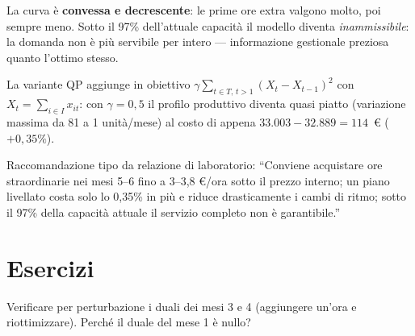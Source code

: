 \begin{center}
%
\hfill
\begin{minipage}[b]{0.46\textwidth}\small
La curva è \textbf{convessa e decrescente}: le prime ore extra valgono molto, poi
sempre meno. Sotto il 97\% dell'attuale capacità il modello diventa
\emph{inammissibile}: la domanda non è più servibile per intero --- informazione
gestionale preziosa quanto l'ottimo stesso.

\vspace{1ex}
La variante QP aggiunge in obiettivo $\gamma \sum_{t \in T,\, t>1} (X_t - X_{t-1})^2$ con
$X_t = \sum_{i \in I} x_{it}$: con $\gamma = 0{,}5$ il profilo produttivo diventa quasi piatto
(variazione massima da 81 a 1 unità/mese) al costo di appena
$33.003 - 32.889 = 114$~\euro{} ($+0{,}35\%$).
\end{minipage}
\end{center}

\begin{insight}
Raccomandazione tipo da relazione di laboratorio: ``Conviene acquistare ore
straordinarie nei mesi 5--6 fino a 3--3,8 \euro/ora sotto il prezzo interno; un piano
livellato costa solo lo 0,35\% in più e riduce drasticamente i cambi di ritmo; sotto
il 97\% della capacità attuale il servizio completo non è garantibile.''
\end{insight}

\section{Esercizi}

\begin{esercizio}[verifica]
Verificare per perturbazione i duali dei mesi 3 e 4 (aggiungere un'ora e riottimizzare).
Perché il duale del mese 1 è nullo?
\end{esercizio}

